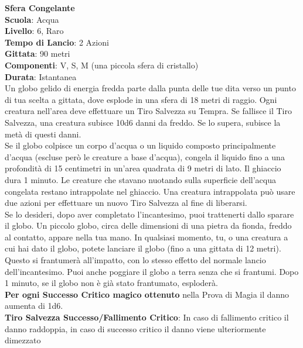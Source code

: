 \begin{multicols}{2}
\medskip\textbf{Sfera Congelante}\\
\textbf{Scuola}: Acqua\\
\textbf{Livello}: 6, Raro\\
\textbf{Tempo di Lancio}: 2 Azioni\\
\textbf{Gittata}: 90 metri\\
\textbf{Componenti}: V, S, M (una piccola sfera di cristallo)\\
\textbf{Durata}: Istantanea\\
Un globo gelido di energia fredda parte dalla punta delle tue dita verso un punto di tua scelta a gittata, dove esplode in una sfera di 18 metri di raggio. Ogni creatura nell'area deve effettuare un Tiro Salvezza su Tempra. Se fallisce il Tiro Salvezza, una creatura subisce 10d6 danni da freddo. Se lo supera, subisce la metà di questi danni.\\
Se il globo colpisce un corpo d'acqua o un liquido composto principalmente d'acqua (escluse però le creature a base d'acqua), congela il liquido fino a una profondità di 15 centimetri in un'area quadrata di 9 metri di lato. Il ghiaccio dura 1 minuto. Le creature che stavano nuotando sulla superficie dell'acqua congelata restano intrappolate nel ghiaccio. Una creatura intrappolata può usare due azioni per effettuare un nuovo Tiro Salvezza al fine di liberarsi.\\
Se lo desideri, dopo aver completato l'incantesimo, puoi trattenerti dallo sparare il globo. Un piccolo globo, circa delle dimensioni di una pietra da fionda, freddo al contatto, appare nella tua mano. In qualsiasi momento, tu, o una creatura a cui hai dato il globo, potete lanciare il globo (fino a una gittata di 12 metri). Questo si frantumerà all'impatto, con lo stesso effetto del normale lancio dell'incantesimo. Puoi anche poggiare il globo a terra senza che si frantumi. Dopo 1 minuto, se il globo non è già stato frantumato, esploderà.\\
\textbf{Per ogni Successo Critico magico ottenuto} nella Prova di Magia il danno aumenta di 1d6.\\
\textbf{Tiro Salvezza Successo/Fallimento Critico}: In caso di fallimento critico il danno raddoppia, in caso di successo critico il danno viene ulteriormente dimezzato


\end{multicols}
